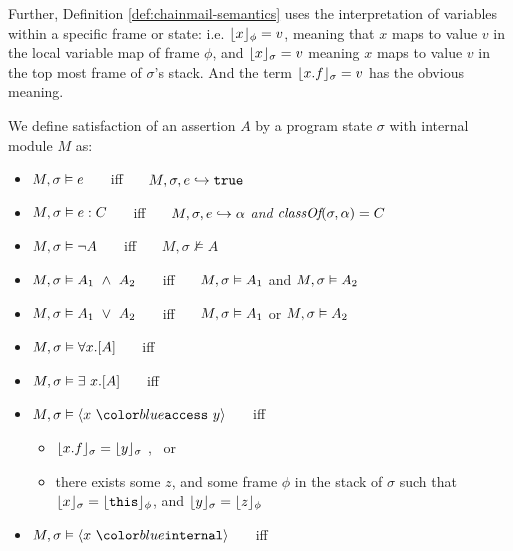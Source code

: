 Further, Definition \ref{def:chainmail-semantics} uses the interpretation of variables
within a specific frame or state: i.e. $\lfloor x \rfloor_{\phi} = v$, meaning that $x$ maps to
value $v$ in the local variable map of frame $\phi$, and $\lfloor x \rfloor_{\sigma} = v$ meaning $x$ 
maps to value $v$ in the top most frame of $\sigma$'s stack. And the term  $\lfloor x.f \rfloor_{\sigma} = v$
has the obvious meaning.


\begin{definition} 
\label{def:chainmail-semantics}
We define satisfaction of an assertion $A$ by a program state $\sigma$ with internal module $M$ as:
\begin{itemize}
\item
$M , \sigma \vDash e$ \ \ \ iff \ \ \  $M, \sigma, e \hookrightarrow \texttt{true}$
\item
$M , \sigma \vDash e : C$ \ \ \ iff \ \ \  $M, \sigma, e \hookrightarrow \alpha$ \textit{and} $\textit{classOf}(\sigma, \alpha) = C$
\item
$M , \sigma \vDash \neg A$ \ \ \ iff \ \ \  ${M},{\sigma}\nvDash{A}$
\item
$\satisfiesA{M}{\sigma}{A_1\ \wedge\ A_2}$ \ \ \ iff \ \ \  $M , \sigma \vDash A_1$ and 
$M , \sigma \vDash A_2$
\item
$\satisfiesA{M}{\sigma}{A_1\ \vee\ A_2}$ \ \ \ iff \ \ \  $M , \sigma \vDash A_1$ or 
$M , \sigma \vDash A_2$
\item
$M , \sigma \vDash \forall x.[A]$ \ \ \ iff \ \ \  
\item
$M , \sigma \vDash \exists\ x.[A]$ \ \ \ iff \ \ \  
\item
$\satisfiesA{M}{\sigma}{\access{x}{y}}$ \ \ \ iff \ \ \  
\begin{itemize}
\item
$\lfloor x.f \rfloor_{\sigma}={\lfloor y \rfloor_{\sigma}}$ \sd{for some $f$}, \  or
\item
there exists some $z$, and some frame $\phi$ in the stack of $\sigma$ such that {$\lfloor x \rfloor_{\sigma}=\lfloor {\texttt{this}} \rfloor_{\phi}$}, {and $\lfloor y \rfloor_{\sigma}=\lfloor z \rfloor_{\phi}$}
\end{itemize}
\item
$\satisfiesA{M}{\sigma}{\internal{x}}$ \ \ \ iff \ \ \  

\end{itemize}
\end{definition}
